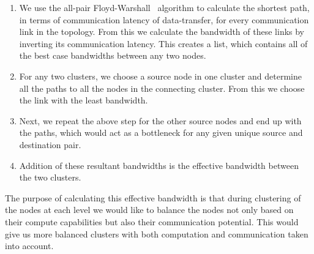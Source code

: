 \begin{itemize}
  \begin{enumerate}

  \item We use the all-pair Floyd-Warshall~\cite{sski08} algorithm to
    calculate the shortest path, in terms of communication latency of
    data-transfer, for every communication link in the topology. From this we
    calculate the bandwidth of these links by inverting its communication
    latency. This creates a list, which contains all of the best case
    bandwidths between any two nodes.

  \item For any two clusters, we choose a source node in one cluster and
    determine all the paths to all the nodes in the connecting
    cluster. From this we choose the link with the least bandwidth.

  \item Next, we repeat the above step for the other source nodes and
    end up with the paths, which would act as a bottleneck for any given
    unique source and destination pair.

  \item Addition of these resultant bandwidths is the effective
    bandwidth between the two clusters.

  \end{enumerate}

  The purpose of calculating this effective bandwidth is that during clustering
  of the nodes at each level we would like to balance the nodes not only based on
  their compute capabilities but also their communication potential. This would
  give us more balanced clusters with both computation and communication taken
  into account.



\end{itemize}
